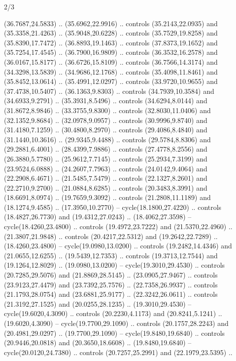 \begin{flagdescription}{2/3}
\begin{scope}[yshift=\flagwidth,scale=\flagwidth/1241.93737]
\begin{scope}[y=-1mm, x=1mm,draw=gold,fill=blue,line join=miter,miter limit=4,line width=1.8\lw]
\begin{scope}[y=1mm, x=1mm, yscale=-1,shift={(573.68mm+\str,145.75)}]
\begin{scope}[scale=1.35,shift={(-9,-3)}]
\begin{scope}[scale=0.55]
\begin{scope}[scale=1.333]
    (36.7687,24.5833) .. (35.6962,22.9916) .. controls (35.2143,22.0935) and
    (35.3358,21.4263) .. (35.9048,20.6228) .. controls (35.7529,19.8258) and
    (35.8390,17.7472) .. (36.8893,19.1463) .. controls (37.8373,19.1652) and
    (35.7254,17.4545) .. (36.7900,16.9809) .. controls (36.3532,16.2578) and
    (36.0167,15.8177) .. (36.6726,15.8109) .. controls (36.7566,14.3174) and
    (34.3298,13.5839) .. (34.9686,12.1768) .. controls (35.4098,11.8461) and
    (35.8452,13.0614) .. (35.4991,12.0297) .. controls (33.9720,10.9655) and
    (37.4738,10.5407) .. (36.1363,9.8303) .. controls (34.7939,10.3584) and
    (34.6933,9.2791) .. (35.3931,8.5496) .. controls (34.6294,8.0144) and
    (31.8672,8.9846) .. (33.3755,9.8300) .. controls (32.8030,11.0406) and
    (32.1352,9.8684) .. (32.0978,9.0957) .. controls (30.9996,9.8740) and
    (31.4180,7.1259) .. (30.4800,8.2970) .. controls (29.4086,8.4840) and
    (31.1440,10.3616) .. (29.9345,9.4488) .. controls (29.5784,8.8306) and
    (29.2881,6.4001) .. (28.4399,7.9886) .. controls (27.4778,8.2556) and
    (26.3880,5.7780) .. (25.9612,7.7145) .. controls (25.2934,7.3199) and
    (23.9524,6.0888) .. (24.2607,7.7963) .. controls (24.0142,9.4064) and
    (22.2908,6.4671) .. (21.5485,7.5479) .. controls (22.1327,8.2601) and
    (22.2710,9.2700) .. (21.0884,8.6285) .. controls (20.3483,8.3991) and
    (18.6691,8.0974) .. (19.7659,9.3092) .. controls (21.2808,11.1189) and
    (18.1274,9.4585) .. (17.3950,10.2770) -- cycle(18.1800,27.4220) .. controls
    (18.4827,26.7730) and (19.4312,27.0243) .. (18.4062,27.3598) --
    cycle(18.4260,23.4800) .. controls (19.4972,23.7222) and (21.5370,22.4960) ..
    (21.3807,21.9848) .. controls (20.4217,22.5312) and (19.2642,22.7289) ..
    (18.4260,23.4800) -- cycle(19.0980,13.0200) .. controls (19.2482,14.4346) and
    (21.0655,12.6255) .. (19.5439,12.7353) .. controls (19.3713,12.7544) and
    (19.1264,12.8029) .. (19.0980,13.0200) -- cycle(19.3010,29.4530) .. controls
    (20.7285,29.5076) and (21.8869,28.5145) .. (23.0905,27.9467) .. controls
    (23.9123,27.4479) and (23.7392,25.7576) .. (22.7358,26.9937) .. controls
    (21.1793,28.0754) and (23.6881,25.9177) .. (22.3242,26.0611) .. controls
    (21.3192,27.1525) and (20.0255,28.1235) .. (19.3010,29.4530) --
    cycle(19.6020,4.3090) .. controls (20.2230,4.1173) and (20.8241,5.1241) ..
    (19.6020,4.3090) -- cycle(19.7700,29.1090) .. controls (20.1757,28.2243) and
    (20.4981,29.0297) .. (19.7700,29.1090) -- cycle(19.8480,19.6840) .. controls
    (20.9446,20.0818) and (20.3650,18.6608) .. (19.8480,19.6840) --
    cycle(20.0120,24.7380) .. controls (20.7257,25.2991) and (22.1979,23.5395) ..

\end{scope}
\end{scope}
\end{scope}
\end{scope}
\end{scope}
\end{scope}
\end{flagdescription}
